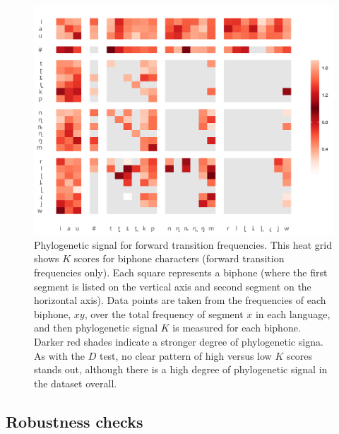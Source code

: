\begin{figure}

{\centering \includegraphics[width=0.75\linewidth]{05-phylo-signal/fig/k-swatch} 

}

\caption{Phylogenetic signal for forward transition frequencies. This heat grid shows $K$ scores for biphone characters (forward transition frequencies only). Each square represents a biphone (where the first segment is listed on the vertical axis and second segment on the horizontal axis). Data points are taken from the frequencies of each biphone, $xy$, over the total frequency of segment $x$ in each language, and then phylogenetic signal $K$ is measured for each biphone. Darker red shades indicate a stronger degree of phylogenetic signa. As with the $D$ test, no clear pattern of high versus low $K$ scores stands out, although there is a high degree of phylogenetic signal in the dataset overall.}\label{fig:k-swatch}
\end{figure}

\hypertarget{phy-sig-cont-robustness}{%
\subsection{Robustness checks}\label{phy-sig-cont-robustness}}

